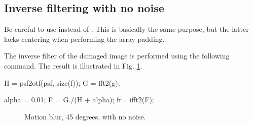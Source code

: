\subsection{Inverse filtering with no noise}

\begin{mcomment}
\begin{mremark}
Be careful to use  instead of . This is basically the same purpose, but the latter lacks centering when performing the array padding.
\end{mremark}
\end{mcomment}

The inverse filter of the damaged image is performed using the following \matlabregistered{} command. 
The result is illustrated in Fig. \ref{fig:deblurring:matlab:nonoise}.

\begin{matlab}
H = psf2otf(psf, size(f));
G = fft2(g);

alpha = 0.01;
F = G./(H + alpha);
fr= ifft2(F);
\end{matlab}

\begin{figure}[htbp]
 \centering
 \hspace{1cm}
 \caption{Motion blur, 45 degrees, with no noise.}
 \label{fig:deblurring:matlab:nonoise}
\end{figure}

